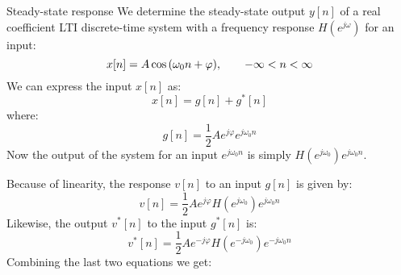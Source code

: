 \documentclass[../../main/main.tex]{subfiles}
\begin{document}
\begin{example}{Steady-state response}{}
    We determine the steady-state output \( y[n] \) of a real coefficient LTI discrete-time system with a frequency response \( H(e^{j\omega}) \) for an input:
    \begin{equation}
        x[n]
        =
        A \cos\qty(\omega_{0}n + \varphi),
        \qquad
        -\infty < n < \infty
        \label{eq:L09_S43_1}
    \end{equation}
    We can express the input \( x[n] \) as:
    \begin{equation}
        x[n]
        =
        g[n] + g^*[n]
        \label{eq:L09_S44_1}
    \end{equation}
    where:
    \begin{equation}
        g[n]
        =
        \frac{1}{2} A e^{j \varphi} e^{j \omega_{0}n}
        \label{eq:L09_S44_2}
    \end{equation}
    Now the output of the system for an input \( e^{j \omega_{0}n} \) is simply \( H(e^{j\omega_{0}}) e^{j\omega_{0}n} \).

    Because of linearity, the response \( v[n] \) to an input \( g[n] \) is given by:
    \begin{equation}
        v[n]
        =
        \frac{1}{2} A e^{j \varphi} H(e^{j \omega_{0}}) e^{j\omega_{0}n}
        \label{eq:L09_S45_1}
    \end{equation}
    Likewise, the output \( v^*[n] \) to the input \( g^*[n] \) is:
    \begin{equation}
        v^*[n]
        =
        \frac{1}{2} A e^{-j \varphi} H(e^{-j \omega_{0}}) e^{-j\omega_{0}n}
        \label{eq:L09_S45_2}
    \end{equation}
    Combining the last two equations we get:
\end{example}
\end{document}
